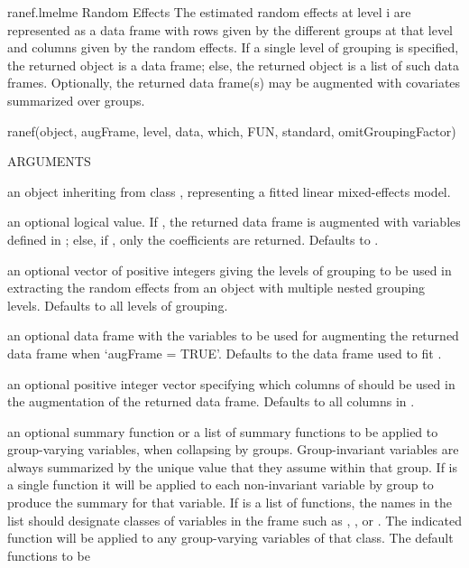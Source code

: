 \documentclass[pdftex]{article} \usepackage{url,graphicx}
\begin{document}
\begin{Helpfile}{ranef.lme}{lme Random Effects}
The estimated random effects at level i are represented as a
data frame with rows given by the different groups at that level and
columns given by the random effects. If a single level of
grouping is specified, the returned object is a data frame; else, the
returned object is a list of such data frames. Optionally, the
returned data frame(s) may be augmented with covariates summarized
over groups.
\begin{Example}
ranef(object, augFrame, level, data, which, FUN, standard, 
               omitGroupingFactor)
\end{Example}
\begin{Argument}{ARGUMENTS}
\item[\Co{object:}]
an object inheriting from class , representing
a fitted linear mixed-effects model.
\item[\Co{augFrame:}]
an optional logical value. If , the returned
data frame is augmented with variables defined in ; else,
if , only the coefficients are returned. Defaults to
.
\item[\Co{level:}]
an optional vector of positive integers giving the levels
of grouping to be used in extracting the random effects from an
object with multiple nested grouping levels. Defaults to all levels
of grouping.
\item[\Co{data:}]
an optional data frame with the variables to be used for
augmenting the returned data frame when `augFrame =
     TRUE'. Defaults to the data frame used to fit .
\item[\Co{which:}]
an optional positive integer vector specifying which
columns of  should be used in the augmentation of the
returned data frame. Defaults to all columns in .
\item[\Co{FUN:}]
an optional summary function or a list of summary functions
to be applied to group-varying variables, when collapsing 
by groups.  Group-invariant variables are always summarized by the
unique value that they assume within that group. If  is a
single function it will be applied to each non-invariant variable by
group to produce the summary for that variable.  If  is a
list of functions, the names in the list should designate classes of
variables in the frame such as , , or
.  The indicated function will be applied to any
group-varying variables of that class.  The default functions to be

\end{Argument}
\end{Helpfile}
\end{document}
